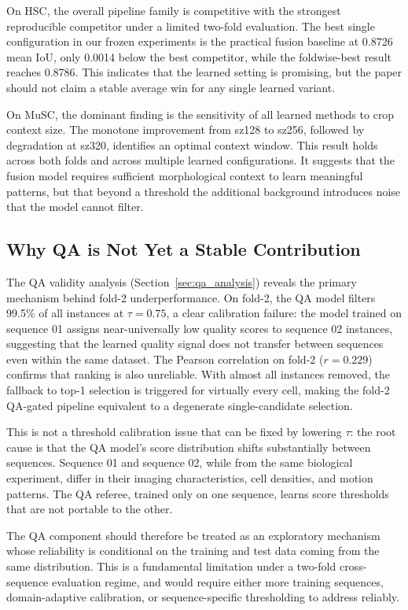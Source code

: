 On HSC, the overall pipeline family is competitive with the strongest reproducible competitor under
a limited two-fold evaluation. The best single configuration in our frozen experiments is the
practical fusion baseline at 0.8726 mean IoU, only 0.0014 below the best competitor, while the
foldwise-best result reaches 0.8786. This indicates that the learned setting is promising, but the
paper should not claim a stable average win for any single learned variant.

On MuSC, the dominant finding is the sensitivity of all learned methods to crop context size. The
monotone improvement from sz128 to sz256, followed by degradation at sz320, identifies an optimal
context window. This result holds across both folds and across multiple learned configurations. It
suggests that the fusion model requires sufficient morphological context to learn meaningful
patterns, but that beyond a threshold the additional background introduces noise that the model
cannot filter.

\subsection{Why QA is Not Yet a Stable Contribution}

The QA validity analysis (Section~\ref{sec:qa_analysis}) reveals the primary mechanism behind
fold-2 underperformance. On fold-2, the QA model filters 99.5\% of all instances at $\tau = 0.75$,
a clear calibration failure: the model trained on sequence 01 assigns near-universally low quality
scores to sequence 02 instances, suggesting that the learned quality signal does not transfer
between sequences even within the same dataset. The Pearson correlation on fold-2 ($r = 0.229$)
confirms that ranking is also unreliable. With almost all instances removed, the fallback to top-1
selection is triggered for virtually every cell, making the fold-2 QA-gated pipeline equivalent to
a degenerate single-candidate selection.

This is not a threshold calibration issue that can be fixed by lowering $\tau$: the root cause is
that the QA model's score distribution shifts substantially between sequences. Sequence 01 and
sequence 02, while from the same biological experiment, differ in their imaging characteristics,
cell densities, and motion patterns. The QA referee, trained only on one sequence, learns score
thresholds that are not portable to the other.

The QA component should therefore be treated as an exploratory mechanism whose reliability is
conditional on the training and test data coming from the same distribution. This is a fundamental
limitation under a two-fold cross-sequence evaluation regime, and would require either more
training sequences, domain-adaptive calibration, or sequence-specific thresholding to address
reliably.

